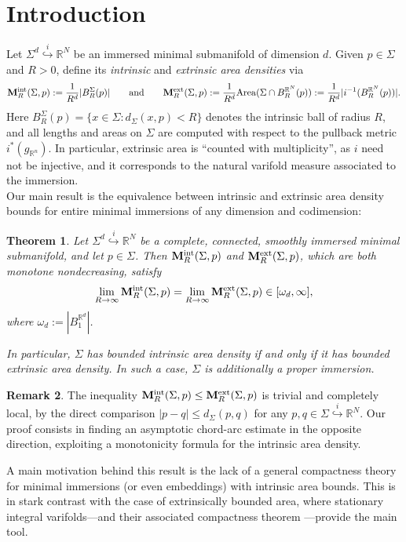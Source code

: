 \documentclass{article}
\makeatletter
\newcommand{\R}{\mathbb{R}}
\newtheorem{theorem}{Theorem}[section]
\theoremstyle{definition}
\newtheorem{remark}[theorem]{Remark}
\newcommand{\addressa}[1]{\gdef\@addressa{#1}}
\newcommand{\emaila}[1]{\gdef\@emaila{\url{#1}}}
\makeatother
\begin{document}
\addressa{Enric Florit-Simon \\ Department of Mathematics, ETH Z\"{u}rich \\ Rämistrasse 101, 8092 Zürich, Switzerland}
\emaila{enric.florit@math.ethz.ch}
\newcommand{\enric}[1]{{\color{green}{#1}}}





\section{Introduction}\label{sec:intro}

Let $\Sigma^d\overset{i}{\hookrightarrow}\R^N$ be an immersed minimal submanifold of dimension $d$.
Given $p\in\Sigma$ and $R>0$, define its \textit{intrinsic} and \textit{extrinsic area densities} via
$${\bf M}_R^{{\rm int}}(\Sigma,p):=\frac{1}{R^d}|B_R^\Sigma(p)|\qquad\mbox{and}\qquad {\bf M}_R^{{\rm ext}}(\Sigma,p):=\frac{1}{R^d}{\rm Area}(\Sigma \cap B_R^{\R^N}(p)):=\frac{1}{R^d}|i^{-1}(B_R^{\R^N}(p))|.$$
Here $B_R^\Sigma(p)=\{x\in\Sigma:d_\Sigma(x,p)<R\}$ denotes the intrinsic ball of radius $R$, and all lengths and areas on $\Sigma$ are computed with respect to the pullback metric $i^*(g_{\R^n})$. In particular, extrinsic area is ``counted with multiplicity'', as $i$ need not be injective, and it corresponds to the natural varifold measure associated to the immersion.\\

Our main result is the equivalence between intrinsic and extrinsic area density bounds for entire minimal immersions of any dimension and codimension:
\begin{theorem}\label{thm:extrbound}
    Let $\Sigma^d\overset{i}{\hookrightarrow} \R^N$ be a complete, connected, smoothly immersed minimal submanifold, and let $p\in\Sigma$. Then ${\bf M}_R^{\rm int}(\Sigma,p)$ and ${\bf M}_R^{\rm ext}(\Sigma,p)$, which are both monotone nondecreasing, satisfy
    $$\lim_{R\to\infty} {\bf M}_R^{\rm int}(\Sigma,p)=\lim_{R\to\infty} {\bf M}_R^{\rm ext}(\Sigma,p)\in[\omega_d,\infty],$$
    where $\omega_d:=|B_1^{\R^d}|$.

    In particular, $\Sigma$ has bounded intrinsic area density if and only if it has bounded extrinsic area density. In such a case, $\Sigma$ is additionally a proper immersion.
\end{theorem}
\begin{remark}\label{rmk:trivbound}
    The inequality ${\bf M}_R^{\rm int}(\Sigma,p)\leq {\bf M}_R^{\rm ext}(\Sigma,p)$ is trivial and completely local, by the direct comparison $|p-q|\leq d_{\Sigma}(p,q)$ for any $p,q\in\Sigma\overset{i}{\hookrightarrow}\R^N$. Our proof consists in finding an asymptotic chord-arc estimate in the opposite direction, exploiting a monotonicity formula for the intrinsic area density.
\end{remark}
A main motivation behind this result is the lack of a general compactness theory for minimal immersions (or even embeddings) with intrinsic area bounds. This is in stark contrast with the case of extrinsically bounded area, where stationary integral varifolds---and their associated compactness theorem \cite{All72}---provide the main tool.
\end{document}
